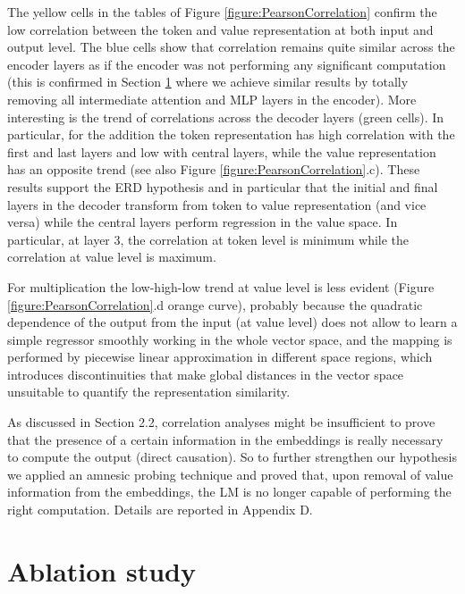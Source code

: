 \documentclass[final,1p,times,authoryear]{elsarticle}
\begin{document}
The yellow cells in the tables of Figure \ref{figure:PearsonCorrelation} confirm the low correlation between the token and value representation at both input and output level. The blue cells show that correlation remains quite similar across the encoder layers as if the encoder was not performing any significant computation (this is confirmed in Section \ref{sec:AblationStudy} where we achieve similar results by totally removing all intermediate attention and MLP layers in the encoder). More interesting is the trend of correlations across the decoder layers (green cells). In particular, for the addition the token representation has high correlation with the first and last layers and low with central layers, while the value representation has an opposite trend (see also Figure \ref{figure:PearsonCorrelation}.c). These results support the ERD hypothesis and in particular that the initial and final layers in the decoder transform from token to value representation (and vice versa) while the central layers perform regression in the value space. In particular, at layer 3, the correlation at token level is minimum while the correlation at value level is maximum.

For multiplication the low-high-low trend at value level is less evident (Figure \ref{figure:PearsonCorrelation}.d orange curve), probably because the quadratic dependence of the output from the input (at value level) does not allow to learn a simple regressor smoothly working in the whole vector space, and the mapping is performed by piecewise linear approximation in different space regions, which introduces discontinuities that make global distances in the vector space unsuitable to quantify the representation similarity.

As discussed in Section 2.2, correlation analyses might be insufficient to prove that the presence of a certain information in the embeddings is really necessary to compute the output (direct causation). So to further strengthen our hypothesis we applied an amnesic probing technique \citep{Elazar2021} and proved that, upon removal of value information from the embeddings, the LM is no longer capable of performing the right computation. Details are reported in Appendix D.  

\section{Ablation study} \label{sec:AblationStudy}
\end{document}
